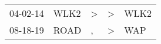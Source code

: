 \begin{supertabular}{lllll}
 04-02-14 &  WLK2 &  \textgreater &  \textgreater &  WLK2 \\
 08-18-19 &  ROAD &             , &  \textgreater &   WAP \\
\end{supertabular}
